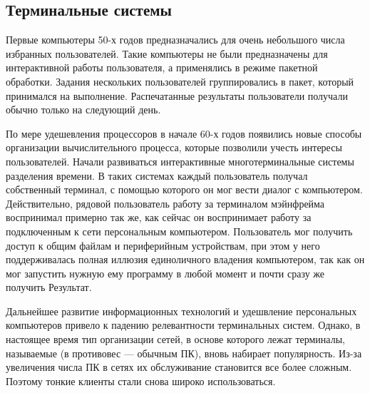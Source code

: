 \subsection{Терминальные системы}
Первые компьютеры 50-х годов предназначались для очень небольшого числа избранных
пользователей. Такие компьютеры не были предназначены для интерактивной работы
пользователя, а применялись в режиме пакетной обработки.  Задания нескольких
пользователей группировались в пакет, который принимался на выполнение. Распечатанные
результаты пользователи получали обычно только на следующий день.

По мере удешевления процессоров в начале 60-х годов появились новые способы организации
вычислительного процесса, которые позволили учесть интересы пользователей.  Начали
развиваться интерактивные многотерминальные системы разделения времени.  В таких
системах каждый пользователь получал собственный терминал, с помощью которого он мог
вести диалог с компьютером.
Действительно, рядовой пользователь работу за терминалом мэйнфрейма воспринимал примерно
так же, как сейчас он воспринимает работу за подключенным к сети персональным
компьютером. Пользователь мог получить доступ к общим файлам и периферийным устройствам,
при этом у него поддерживалась полная иллюзия единоличного владения компьютером, так как
он мог запустить нужную ему программу в любой момент и почти сразу же получить
Результат. \cite{olifer}

Дальнейшее развитие информационных технологий и удешвление персональных компьютеров
привело к падению релевантности терминальных систем. Однако, в настоящее время тип
организации сетей, в основе которого лежат терминалы, называемые 
(в противовес  — обычным ПК), вновь набирает популярность. Из-за
увеличения числа ПК в сетях их обслуживание становится все более сложным. Поэтому тонкие
клиенты стали снова широко использоваться.
